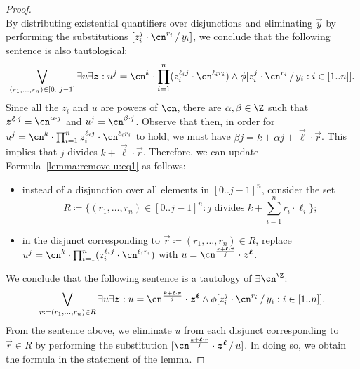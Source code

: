 \begin{proof}
\[    \]
    By distributing existential quantifiers over disjunctions and eliminating
    $\vec y$ by performing the substitutions $\sub{z_i^j \cdot \cn^{r_i}}{y_i}$,
    we conclude that the following sentence is also tautological:
    \begin{equation}
        \label{lemma:remove-u:eq1}
        \bigvee_{(r_1,\dots,r_n) \in [0..j-1]} \exists u \exists \vec z : u^{j} = \cn^{k} \cdot \prod_{i=1}^n (z_i^{\ell_i j} \cdot \cn^{\ell_i r_i})  \land \phi\sub{z_i^j \cdot \cn^{r_i}}{y_i : i \in [1..n]}.
    \end{equation}
    Since all the $z_i$ and $u$ are powers of $\cn$, there are $\alpha,\beta \in
    \Z$ such that $\vec z^{\vec\ell\cdot j}=\cn^{\alpha \cdot j}$ and
    $u^j=\cn^{\beta \cdot j}$. Observe that then, in order for $u^{j} = \cn^{k}
    \cdot \prod_{i=1}^n z_i^{\ell_ij} \cdot \cn^{\ell_ir_i}$ to hold, we must
    have $\beta j = k + \alpha j + \vec \ell \cdot \vec r$. This implies that
    $j$ divides $k+ \vec \ell \cdot \vec r$. Therefore, we can update
    Formula~\eqref{lemma:remove-u:eq1} as follows: 
    \begin{itemize}
        \item instead of a disjunction over all elements in $[0..j-1]^n$,
        consider the set 
        \[
        R \coloneqq \big\{(r_1,\dots,r_n)\in[0..j-1]^n : j \text{ divides } k + \textstyle\sum_{i=1}^n r_i \cdot \ell_i\big\};
        \]
        \item in the disjunct corresponding to $\vec r \coloneqq (r_1,\dots,r_n)
        \in R$, replace $u^{j} = \cn^{k} \cdot \prod_{i=1}^n (z_i^{\ell_ij}
        \cdot \cn^{\ell_ir_i})$ with $u = \cn^{\frac{k+\vec \ell \cdot
        \vec{r}}{j}}\cdot \vec z^{\vec\ell}$.
    \end{itemize}
    We conclude that the following sentence is a tautology of $\exists
    \ipow{\cn}$: 
    \[
        \bigvee_{\vec r \coloneqq (r_1,\dots,r_n) \in R} \exists u \exists \vec z : u = \cn^{\frac{k+\vec \ell \cdot \vec r}{j}}\cdot \vec z^{\vec\ell} \land \phi\sub{z_i^j \cdot \cn^{r_i}}{y_i : i \in [1..n]}.
    \]
    From the sentence above, we eliminate $u$ from each disjunct corresponding
    to $\vec r \in R$ by performing the substitution
    $\sub{\cn^{\frac{k+\vec{\ell} \cdot \vec r}{j}}\cdot \vec z^{\vec\ell}}{u}$.
    In doing so, we obtain the formula in the statement of the lemma.
\end{proof}

\TheoremSmallModelProperty*


